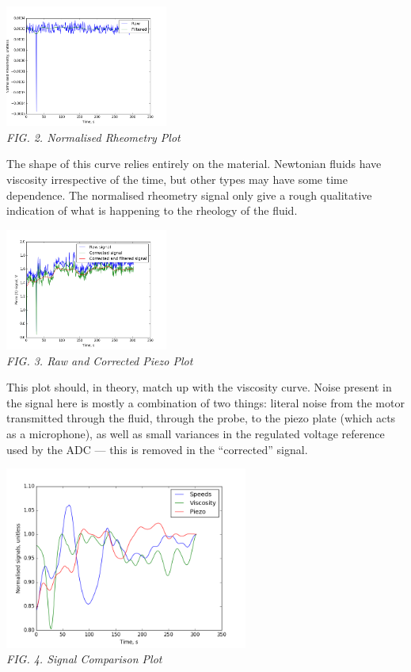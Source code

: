 \documentclass{article}
\begin{document}
	{\centering \includegraphics[width=0.4\textwidth]{viscometry.png}\\
	\textit{FIG. 2. Normalised Rheometry Plot}\\}

	The shape of this curve relies entirely on the material. Newtonian fluids have viscosity irrespective of the time, but other types may have some time dependence. The normalised rheometry signal only give a rough qualitative indication of what is happening to the rheology of the fluid.
	
	{\centering \includegraphics[width=0.4\textwidth]{general_piezo.png}\\
	\textit{FIG. 3. Raw and Corrected Piezo Plot}\\}

	This plot should, in theory, match up with the viscosity curve. Noise present in the signal here is mostly a combination of two things: literal noise from the motor transmitted through the fluid, through the probe, to the piezo plate (which acts as a microphone), as well as small variances in the regulated voltage reference used by the ADC --- this is removed in the ``corrected'' signal.
	
	\onecolumn
	
	{\centering \includegraphics[width=0.6\textwidth]{signal_compare.png}\\
	\textit{FIG. 4. Signal Comparison Plot}\\}
\end{document}
